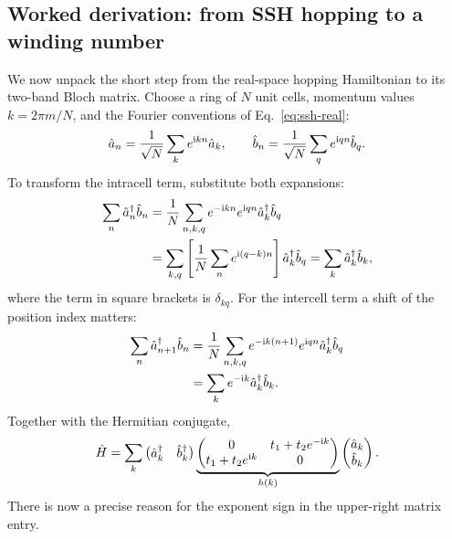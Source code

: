 \subsection*{Worked derivation: from SSH hopping to a winding number}
We now unpack the short step from the real-space hopping
Hamiltonian to its two-band Bloch matrix. Choose a ring of $N$
unit cells, momentum values $k=2\pi m/N$, and the Fourier
conventions of Eq.~\eqref{eq:ssh-real}:
\begin{equation}
\hat{a}_n=\frac1{\sqrt N}\sum_k e^{\mathrm{i} kn}\hat{a}_k,\qquad
\hat{b}_n=\frac1{\sqrt N}\sum_q e^{\mathrm{i} qn}\hat{b}_q.
\end{equation}
To transform the intracell term, substitute both expansions:
\begin{align}
\sum_n \hat{a}_n^\dagger\hat{b}_n
&=\frac1N\sum_{n,k,q}
 e^{-\mathrm{i} kn}e^{\mathrm{i} qn}\hat{a}_k^\dagger\hat{b}_q\notag\\
&=\sum_{k,q}\left[\frac1N\sum_n
 e^{\mathrm{i}(q-k)n}\right]\hat{a}_k^\dagger\hat{b}_q
=\sum_k\hat{a}_k^\dagger\hat{b}_k,
\end{align}
where the term in square brackets is $\delta_{kq}$.
For the intercell term a shift of the position index matters:
\begin{align}
\sum_n\hat{a}_{n+1}^\dagger\hat{b}_n
&=\frac1N\sum_{n,k,q}
 e^{-\mathrm{i} k(n+1)}e^{\mathrm{i} qn}
 \hat{a}_k^\dagger\hat{b}_q\notag\\
&=\sum_k e^{-\mathrm{i} k}\hat{a}_k^\dagger\hat{b}_k.
\end{align}
Together with the Hermitian conjugate,
\begin{equation}
\hat{H}=\sum_k\begin{pmatrix}
\hat{a}_k^\dagger&\hat{b}_k^\dagger
\end{pmatrix}
\underbrace{\begin{pmatrix}
0&t_1+t_2e^{-\mathrm{i} k}\\
t_1+t_2e^{\mathrm{i} k}&0
\end{pmatrix}}_{h(k)}
\begin{pmatrix}\hat{a}_k\\\hat{b}_k\end{pmatrix}.
\end{equation}
There is now a precise reason for the exponent sign in
the upper-right matrix entry.

